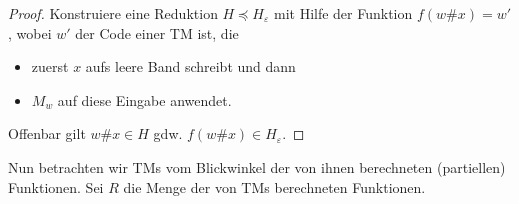 \begin{proof}
  Konstruiere eine Reduktion $H \preceq H_\varepsilon$ mit Hilfe der
  Funktion $f(w\#x) = w'$, wobei $w'$ der Code einer \ac{TM} ist, die
  \begin{itemize}
  \item zuerst $x$ aufs leere Band schreibt und dann
  \item $M_w$ auf diese Eingabe anwendet.
  \end{itemize}
  Offenbar gilt $w\#x\in H$ gdw. $f (w\#x) \in H_\varepsilon$.
\end{proof}

Nun betrachten wir \ac{TM}s vom Blickwinkel der von ihnen berechneten
(partiellen) Funktionen. Sei $R$ die Menge der von \ac{TM}s berechneten
Funktionen.

